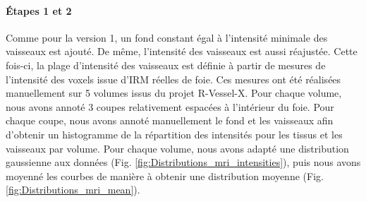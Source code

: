 \paragraph{Étapes 1 et 2}
Comme pour la version 1, un fond constant égal à l'intensité minimale des vaisseaux est ajouté. De même, l'intensité des vaisseaux est aussi réajustée. Cette fois-ci, la plage d'intensité des vaisseaux est définie à partir de mesures de l'intensité des voxels issue d'IRM réelles de foie. Ces mesures ont été réalisées manuellement sur 5 volumes issus du projet R-Vessel-X. Pour chaque volume, nous avons annoté 3 coupes relativement espacées à l'intérieur du foie. Pour chaque coupe, nous avons annoté manuellement le fond et les vaisseaux afin d'obtenir un histogramme de la répartition des intensités pour les tissus et les vaisseaux par volume. Pour chaque volume, nous avons adapté une distribution gaussienne aux données (Fig. \ref{fig:Distributions_mri_intensities}),  puis nous avons moyenné les courbes de manière à obtenir une distribution moyenne (Fig. \ref{fig:Distributions_mri_mean}).
